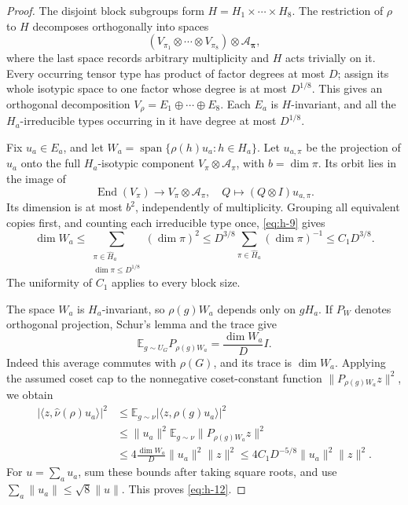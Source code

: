 \documentclass[11pt]{article}
\theoremstyle{remark}
\numberwithin{equation}{section}
\begin{document}
\begin{proof}
The disjoint block subgroups form \(H=H_1\times\cdots\times H_8\). The restriction of \(\rho\) to \(H\) decomposes orthogonally into spaces
\[
 (V_{\pi_1}\otimes\cdots\otimes V_{\pi_8})
       \otimes\mathcal A_{\boldsymbol\pi},
\]
where the last space records arbitrary multiplicity and \(H\) acts trivially on it. Every occurring tensor type has product of factor degrees at most \(D\); assign its whole isotypic space to one factor whose degree is at most \(D^{1/8}\). This gives an orthogonal decomposition \(V_\rho=E_1\oplus\cdots\oplus E_8\). Each \(E_a\) is \(H\)-invariant, and all the \(H_a\)-irreducible types occurring in it have degree at most \(D^{1/8}\).

Fix \(u_a\in E_a\), and let
\(W_a=\operatorname{span}\{\rho(h)u_a:h\in H_a\}\).
Let \(u_{a,\pi}\) be the projection of \(u_a\) onto the full \(H_a\)-isotypic component \(V_\pi\otimes\mathcal A_\pi\), with \(b=\dim\pi\). Its orbit lies in the image of
\[
 \operatorname{End}(V_\pi)\longrightarrow V_\pi\otimes\mathcal A_\pi,
 \quad Q\longmapsto(Q\otimes I)u_{a,\pi}.
\]
Its dimension is at most \(b^2\), independently of multiplicity. Grouping all equivalent copies first, and counting each irreducible type once, \eqref{eq:h-9} gives
\begin{equation}\label{eq:h-13}
 \dim W_a\le\sum_{\substack{\pi\in\widehat H_a\\\dim\pi\le D^{1/8}}}
                 (\dim\pi)^2
 \le D^{3/8}\sum_{\pi\in\widehat H_a}(\dim\pi)^{-1}
 \le C_1D^{3/8}.
\end{equation}
The uniformity of \(C_1\) applies to every block size.

The space \(W_a\) is \(H_a\)-invariant, so \(\rho(g)W_a\) depends only on \(gH_a\). If \(P_W\) denotes orthogonal projection, Schur's lemma and the trace give
\[
 \mathbb E_{g\sim U_G}P_{\rho(g)W_a}
       =\frac{\dim W_a}{D}I.
\]
Indeed this average commutes with \(\rho(G)\), and its trace is \(\dim W_a\). Applying the assumed coset cap to the nonnegative coset-constant function \(\|P_{\rho(g)W_a}z\|^2\), we obtain
\[
 \begin{aligned}
 |\langle z,\widehat\nu(\rho)u_a\rangle|^2
 &\le\mathbb E_{g\sim\nu}|\langle z,\rho(g)u_a\rangle|^2\\
 &\le\|u_a\|^2\mathbb E_{g\sim\nu}
                  \|P_{\rho(g)W_a}z\|^2\\
 &\le4\frac{\dim W_a}{D}\|u_a\|^2\|z\|^2
 \le4C_1D^{-5/8}\|u_a\|^2\|z\|^2.
 \end{aligned}
\]
For \(u=\sum_a u_a\), sum these bounds after taking square roots, and use \(\sum_a\|u_a\|\le\sqrt8\|u\|\). This proves \eqref{eq:h-12}.
\end{proof}
\end{document}
